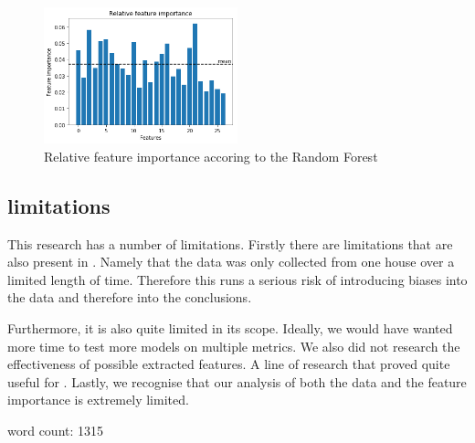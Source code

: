 \documentclass[british]{article}
\begin{document}
	\begin{figure}[!ht]
		\centering
		\includegraphics[width=0.5\textwidth]{relFeatureImp}
		\caption{Relative feature importance accoring to the Random Forest}
		\label{relImp}
	\end{figure}
	
	
	\subsection{limitations} This research has a number of limitations. Firstly there are limitations that are also present in \autocite{Candanedo2017}. Namely that the data was only collected from one house over a limited length of time. Therefore this runs a serious risk of introducing biases into the data and therefore into the conclusions. 
	
	Furthermore, it is also quite limited in its scope. Ideally, we would have wanted more time to test more models on multiple metrics. We also did not research the effectiveness of possible extracted features. A line of research that proved quite useful for \citeauthor{Candanedo2017}. Lastly, we recognise that our analysis of both the data and the feature importance is extremely limited. 
	
	
	
	word count: 1315
	\printbibliography
\end{document}
